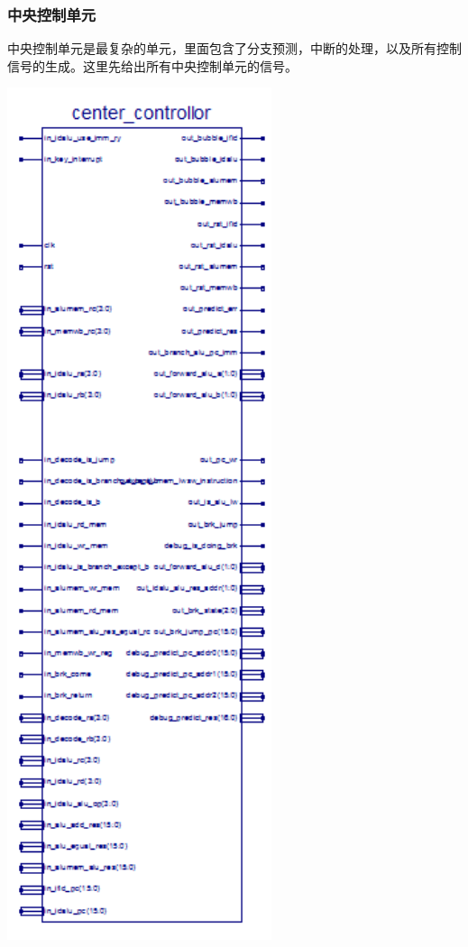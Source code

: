\subsubsection{中央控制单元}
中央控制单元是最复杂的单元，里面包含了分支预测，中断的处理，以及所有控制信号的生成。这里先给出所有中央控制单元的信号。
\begin{center}
    \includegraphics[height=25cm]{image/detail/detail_center_controllor.png}
    \label{fig:center_controllor}
\end{center}
